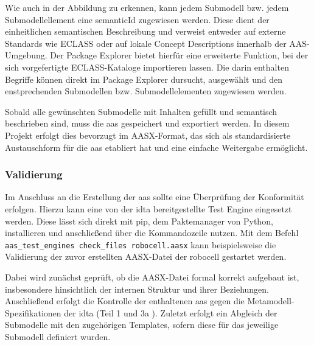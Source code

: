 Wie auch in der Abbildung zu erkennen, kann jedem Submodell bzw. jedem Submodellellement eine semanticId zugewiesen werden.
Diese dient der einheitlichen semantischen Beschreibung und verweist entweder auf externe Standards wie ECLASS oder auf lokale Concept Descriptions innerhalb der AAS-Umgebung.
Der Package Explorer bietet hierfür eine erweiterte Funktion, bei der sich vorgefertigte ECLASS-Kataloge importieren lassen.
Die darin enthalten Begriffe können direkt im Package Explorer dursucht, ausgewählt und den enstprechenden Submodellen bzw. Submodellelementen zugewiesen werden.

Sobald alle gewünschten Submodelle mit Inhalten gefüllt und semantisch beschrieben sind, muss die \acs{aas} gespeichert und exportiert werden.
In diesem Projekt erfolgt dies bevorzugt im AASX-Format, das sich als standardisierte Austauschform für die \acs{aas} etabliert hat und eine einfache Weitergabe ermöglicht.


\subsubsection{Validierung}
Im Anschluss an die Erstellung der \acs{aas} sollte eine Überprüfung der Konformität erfolgen.
Hierzu kann eine von der \acs{idta} bereitgestellte Test Engine \cite{TestEngine} eingesetzt werden. 
Diese lässt sich direkt mit pip, dem Paktemanager von Python, installieren und anschließend über die Kommandozeile nutzen.
Mit dem Befehl \verb|aas_test_engines check_files robocell.aasx| kann beispielsweise die Validierung der zuvor erstellten AASX-Datei der robocell gestartet werden.

Dabei wird zunächst geprüft, ob die AASX-Datei formal korrekt aufgebaut ist, insbesondere hinsichtlich der internen Struktur und ihrer Beziehungen.
Anschließend erfolgt die Kontrolle der enthaltenen \acs{aas} gegen die Metamodell-Spezifikationen der \acs{idta} (Teil 1 \cite{SpezifikationPart1} und 3a \cite{SpezifikationPart3a}).
Zuletzt erfolgt ein Abgleich der Submodelle mit den zugehörigen Templates, sofern diese für das jeweilige Submodell definiert wurden.

